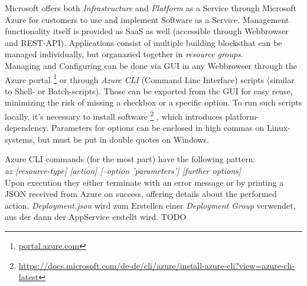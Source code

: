 Microsoft offers both \textit{Infrastructure} and \textit{Platform} as a Service through Microsoft
Azure for customers to use and implement Software as a Service. Management functionality itself is
provided as SaaS as well (accessible through Webbrowser and REST-API).
Applications consist of multiple \glqq building blocks\grqq that can be managed individually, 
but organazied together in \textit{resource groups}. \\
Managing and Configuring can be done via GUI in any Webbrowser through the Azure portal
\footnote{\url{portal.azure.com}}
or through \textit{Azure CLI} (Command Line Interface) scripts (similar to Shell- or Batch-scripts). Those can be exported from the GUI for easy reuse, 
minimizing the risk of missing a checkbox or a specific option. To run such scripts locally, 
it's necessary to install software
\footnote{\url{https://docs.microsoft.com/de-de/cli/azure/install-azure-cli?view=azure-cli-latest}}
, which introduces platform-dependency. Parameters for options 
can be enclosed in high commas on Linux-systems, but must be put in double quotes on Windows.

Azure CLI commands (for the most part) have the following pattern:\\
\textit{az [resource-type] [action] [--option 'parameters'] [further options]}\\
Upon execution they either terminate with an error message or by printing a JSON received from
Azure on success, offering details about the performed action.
\textit{Deployment.json} wird zum Erstellen einer \textit{Deployment Group} verwendet, aus der dann der AppService erstellt wird.
TODO